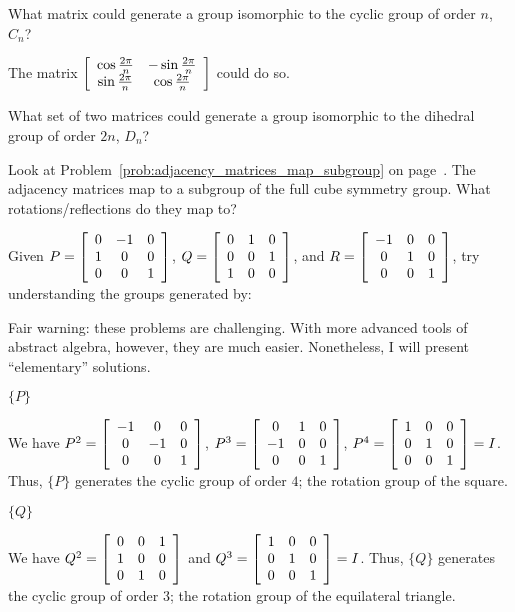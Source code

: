 \documentclass[../key.tex]{subfiles}
\begin{document}
\begin{outer_problem}
\item What matrix could generate a group isomorphic to the cyclic group of order $n$, $C_n$?
\end{outer_problem}

The matrix $\left[\begin{array}{cc} \cos \frac{2\pi}{n} & -\sin \frac{2\pi}{n} \\ \sin \frac{2\pi}{n} & \cos \frac{2\pi}{n} \end{array}\right]$ could do so.

\begin{outer_problem}
\item What set of two matrices could generate a group isomorphic to the dihedral group of order $2n$, $D_n$?
\end{outer_problem}

\begin{outer_problem}
\item Look at Problem~\ref{prob:adjacency_matrices_map_subgroup} on page~\pageref{prob:adjacency_matrices_map_subgroup}. The adjacency matrices map to a subgroup of the full cube symmetry group. What rotations/reflections do they map to?
\end{outer_problem}

\begin{outer_problem}
\item Given $P=\left[\begin{array}{ccc} 0 & -1 & 0 \\ 1 & 0 & 0 \\ 0 & 0 & 1 \end{array}\right]$, $Q=\left[\begin{array}{ccc} 0 & 1 & 0 \\ 0 & 0 & 1 \\ 1 & 0 & 0 \end{array}\right]$, and $R=\left[\begin{array}{ccc} -1 & 0 & 0 \\ 0 & 1 & 0 \\ 0 & 0 & 1 \end{array}\right]$, try understanding the groups generated by:
\end{outer_problem}

Fair warning: these problems are challenging. With more advanced tools of abstract algebra, however, they are much easier. Nonetheless, I will present ``elementary'' solutions.

\begin{inner_problem}[start=1]
\item $\{P\}$
\end{inner_problem}

We have $P^2 = \left[\begin{array}{ccc} -1 & 0 & 0 \\ 0 & -1 & 0 \\ 0 & 0 & 1 \end{array}\right]$, $P^3 = \left[\begin{array}{ccc} 0 & 1 & 0 \\ -1 & 0 & 0 \\ 0 & 0 & 1 \end{array}\right]$, $P^4 = \left[\begin{array}{ccc} 1 & 0 & 0 \\ 0 & 1 & 0 \\ 0 & 0 & 1 \end{array}\right] = I$. Thus, $\{P\}$ generates the cyclic group of order $4$; the rotation group of the square.

\begin{inner_problem}
\item $\{Q\}$
\end{inner_problem}

We have $Q^2 = \left[\begin{array}{ccc} 0 & 0 & 1 \\ 1 & 0 & 0 \\ 0 & 1 & 0 \end{array}\right]$ and $Q^3 = \left[\begin{array}{ccc} 1 & 0 & 0 \\ 0 & 1 & 0 \\ 0 & 0 & 1 \end{array}\right]=I$. Thus, $\{Q\}$ generates the cyclic group of order $3$; the rotation group of the equilateral triangle.
\end{document}
